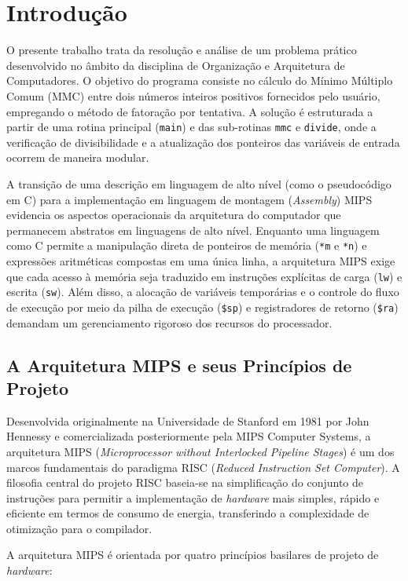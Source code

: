 \section{Introdução}

O presente trabalho trata da resolução e análise de um problema prático desenvolvido no âmbito da disciplina de Organização e Arquitetura de Computadores. O objetivo do programa consiste no cálculo do Mínimo Múltiplo Comum (MMC) entre dois números inteiros positivos fornecidos pelo usuário, empregando o método de fatoração por tentativa. A solução é estruturada a partir de uma rotina principal (\texttt{main}) e das sub-rotinas \texttt{mmc} e \texttt{divide}, onde a verificação de divisibilidade e a atualização dos ponteiros das variáveis de entrada ocorrem de maneira modular.

A transição de uma descrição em linguagem de alto nível (como o pseudocódigo em C) para a implementação em linguagem de montagem (\textit{Assembly}) MIPS evidencia os aspectos operacionais da arquitetura do computador que permanecem abstratos em linguagens de alto nível. Enquanto uma linguagem como C permite a manipulação direta de ponteiros de memória (\texttt{*m} e \texttt{*n}) e expressões aritméticas compostas em uma única linha, a arquitetura MIPS exige que cada acesso à memória seja traduzido em instruções explícitas de carga (\texttt{lw}) e escrita (\texttt{sw}). Além disso, a alocação de variáveis temporárias e o controle do fluxo de execução por meio da pilha de execução (\texttt{\$sp}) e registradores de retorno (\texttt{\$ra}) demandam um gerenciamento rigoroso dos recursos do processador.

\subsection{A Arquitetura MIPS e seus Princípios de Projeto}

Desenvolvida originalmente na Universidade de Stanford em 1981 por John Hennessy e comercializada posteriormente pela MIPS Computer Systems, a arquitetura MIPS (\textit{Microprocessor without Interlocked Pipeline Stages}) é um dos marcos fundamentais do paradigma RISC (\textit{Reduced Instruction Set Computer}). A filosofia central do projeto RISC baseia-se na simplificação do conjunto de instruções para permitir a implementação de \textit{hardware} mais simples, rápido e eficiente em termos de consumo de energia, transferindo a complexidade de otimização para o compilador.

A arquitetura MIPS é orientada por quatro princípios basilares de projeto de \textit{hardware}:

